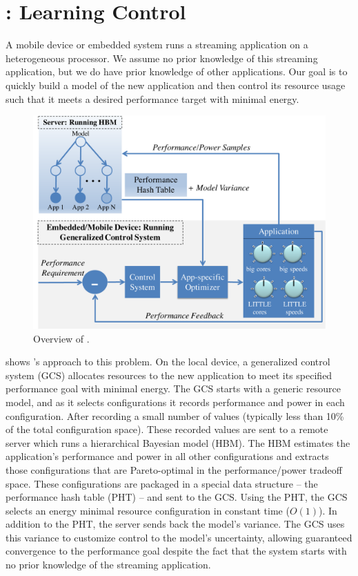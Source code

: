 \section{\SYSTEM{}: Learning Control}
\label{sec:framework}
A mobile device or embedded system runs a streaming application on a
heterogeneous processor.  We assume no prior knowledge of this
streaming application, but we do have prior knowledge of other
applications.  Our goal is to quickly build a model of the new
application and then control its resource usage such that it meets a
desired performance target with minimal energy.

\begin{figure}
\includegraphics[width=\columnwidth]{figures/ControlLearning2.pdf}
\caption{Overview of \SYSTEM{}.}
\label{fig:overview}
\end{figure}


 shows \SYSTEM{}'s approach to this problem.  On
the local device, a generalized control system (GCS) allocates
resources to the new application to meet its specified performance
goal with minimal energy.  The GCS starts with a generic resource
model, and as it selects configurations it records performance and
power in each configuration.  After recording a small number of values
(typically less than 10\% of the total configuration space).  These
recorded values are sent to a remote server which runs a hierarchical
Bayesian model (HBM).  The HBM estimates the application's performance
and power in all other configurations and extracts those
configurations that are Pareto-optimal in the performance/power
tradeoff space.  These configurations are packaged in a special data
structure -- the performance hash table (PHT) -- and sent to the GCS.
Using the PHT, the GCS selects an energy minimal resource
configuration in constant time ($O(1)$).  In addition to the PHT, the
server sends back the model's variance.  The GCS uses this variance to
customize control to the model's uncertainty, allowing guaranteed
convergence to the performance goal despite the fact that the system
starts with no prior knowledge of the streaming application.

